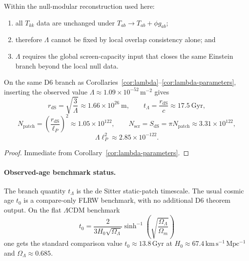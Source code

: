 \begin{theorem}
Within the null-modular reconstruction used here:
\begin{enumerate}[leftmargin=2em]
\item all \(T_{kk}\) data are unchanged under \(T_{ab}\to T_{ab}+\phi g_{ab}\);
\item therefore \(\Lambda\) cannot be fixed by local overlap consistency alone; and
\item \(\Lambda\) requires the global screen-capacity input that closes the same Einstein branch beyond the local null data.
\end{enumerate}
\end{theorem}

\begin{corollary}\label{cor:lambda-benchmark}
On the same D6 branch as Corollaries~\ref{cor:lambda}--\ref{cor:lambda-parameters}, inserting the observed value \(\Lambda\approx 1.09\times 10^{-52}\,\mathrm{m^{-2}}\) gives
\[
r_{\mathrm{dS}}=\sqrt{\frac{3}{\Lambda}}\approx 1.66\times 10^{26}\ \mathrm{m},
\qquad
t_\Lambda=\frac{r_{\mathrm{dS}}}{c}\approx 17.5\ \mathrm{Gyr},
\]
\[
N_{\mathrm{patch}}=\left(\frac{r_{\mathrm{dS}}}{\ell_P}\right)^2
\approx 1.05\times 10^{122},
\qquad
N_{\mathrm{scr}}=S_{\mathrm{dS}}=\pi N_{\mathrm{patch}}
\approx 3.31\times 10^{122},
\]
\[
\Lambda\ell_P^2\approx 2.85\times10^{-122}.
\]
\end{corollary}

\begin{proof}
Immediate from Corollary~\ref{cor:lambda-parameters}.
\end{proof}

\paragraph{Observed-age benchmark status.}
The branch quantity \(t_\Lambda\) is the de Sitter static-patch timescale. The usual cosmic age \(t_0\) is a compare-only FLRW benchmark, with no additional D6 theorem output. On the flat \(\Lambda\)CDM benchmark
\[
t_0=\frac{2}{3H_0\sqrt{\Omega_\Lambda}}
\sinh^{-1}\!\left(\sqrt{\frac{\Omega_\Lambda}{\Omega_m}}\right)
\]
one gets the standard comparison value \(t_0\approx 13.8\,\mathrm{Gyr}\) at
\(H_0\approx 67.4\,\mathrm{km\,s^{-1}\,Mpc^{-1}}\) and \(\Omega_\Lambda\approx 0.685\).


